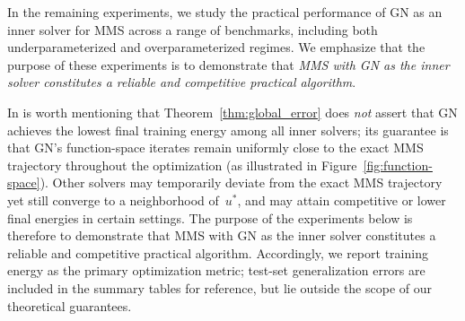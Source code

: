 \documentclass[twoside,11pt]{article}
\begin{document}
In the remaining experiments, we study the practical performance of GN as an inner solver for MMS across a range of benchmarks, including both underparameterized and overparameterized regimes. We emphasize that the purpose of these experiments is to demonstrate that \emph{MMS with GN as the inner solver constitutes a reliable and competitive practical algorithm}. 


\begin{remark}
In is worth mentioning that Theorem~\ref{thm:global_error} does \emph{not} assert that GN achieves the lowest final training energy among all inner solvers; its guarantee is that GN's function-space iterates remain uniformly close to the exact MMS trajectory throughout the optimization (as illustrated in Figure~\ref{fig:function-space}).
Other solvers may temporarily deviate from the exact MMS trajectory yet still converge to a neighborhood of~$u^*$, and may attain competitive or lower final energies in certain settings.
The purpose of the experiments below is therefore to demonstrate that MMS with GN as the inner solver constitutes a reliable and competitive practical algorithm.
Accordingly, we report training energy as the primary optimization metric; test-set generalization errors are included in the summary tables for reference, but lie outside the scope of our theoretical guarantees.
\end{remark}
\end{document}
